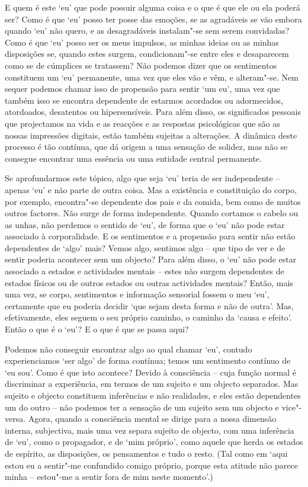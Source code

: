 E quem é este `eu' que pode possuir alguma coisa e o que é que ele ou ela poderá
ser? Como é que `eu' posso ter posse das emoções, se as agradáveis se vão embora
quando `eu' não quero, e as desagradáveis instalam"-se sem serem convidadas? Como
é que `eu' posso ser os meus impulsos, as minhas ideias ou as minhas disposições
se, quando estes surgem, condicionam"-se entre eles e desaparecem como se de
cúmplices se tratassem? Não podemos dizer que os sentimentos constituem um `eu'
permanente, uma vez que eles vão e vêm, e alteram"-se. Nem sequer podemos chamar
isso de propensão para sentir `um eu', uma vez que também isso se encontra
dependente de estarmos acordados ou adormecidos, atordoados, desatentos ou
hipersensíveis. Para além disso, os significados pessoais que projectamos na
vida e as reacções e as respostas psicológicas que são as nossas impressões
digitais, estão também sujeitas a alterações. A dinâmica deste processo é tão
contínua, que dá origem a uma sensação de solidez, mas não se consegue encontrar
uma essência ou uma entidade central permanente.

Se aprofundarmos este tópico, algo que seja `eu' teria de ser independente --
apenas `eu' e não parte de outra coisa. Mas a existência e constituição do
corpo, por exemplo, encontra"-se dependente dos pais e da comida, bem como de
muitos outros factores. Não surge de forma independente. Quando cortamos o
cabelo ou as unhas, não perdemos o sentido de `eu', de forma que o `eu' não pode
estar associado à corporalidade. E os sentimentos e a propensão para sentir não
estão dependentes de `algo' mais? Vemos algo, sentimos algo -- que tipo de ver e
de sentir poderia acontecer sem um objecto? Para além disso, o `eu' não pode
estar associado a estados e actividades mentais -- estes não surgem dependentes
de estados físicos ou de outros estados ou outras actividades mentais? Então,
mais uma vez, se corpo, sentimentos e informação sensorial fossem o meu `eu',
certamente que eu poderia decidir `que sejam desta forma e não de outra'. Mas,
efetivamente, eles seguem o seu próprio caminho, o caminho da `causa e efeito'.
Então o que é o `eu'? E o que é que se passa aqui?

Podemos não conseguir encontrar algo ao qual chamar `eu', contudo experienciamos
`ser algo' de forma contínua; temos um sentimento contínuo de `eu sou'. Como é
que isto acontece? Devido à consciência -- cuja função normal é discriminar a
experiência, em termos de um sujeito e um objecto separados. Mas sujeito e
objecto constituem inferências e não realidades, e eles estão dependentes um do
outro -- não podemos ter a sensação de um sujeito sem um objecto e vice"-versa.
Agora, quando a consciência mental se dirige para a nossa dimensão interna,
subjectiva, mais uma vez separa sujeito de objecto, com uma inferência de `eu',
como o propagador, e de `mim próprio', como aquele que herda os estados de
espírito, as disposições, os pensamentos e tudo o resto. (Tal como em `aqui
estou eu a sentir"-me confundido comigo próprio, porque esta atitude não parece
minha -- estou"-me a sentir fora de mim neste momento'.)

